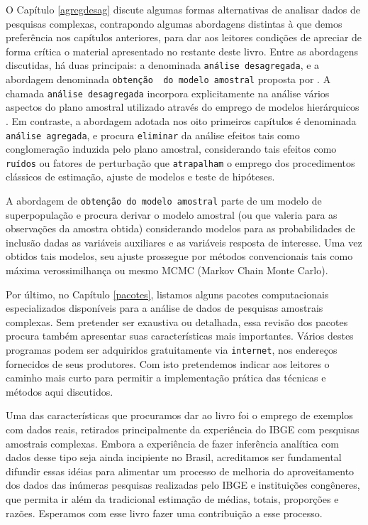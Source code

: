 \documentclass[]{book}
\numberwithin{example}{chapter}
\numberwithin{remark}{chapter}
\numberwithin{definition}{chapter}
\begin{document}
O Capítulo \ref{agregdesag} discute algumas formas alternativas de
analisar dados de pesquisas complexas, contrapondo algumas abordagens
distintas à que demos preferência nos capítulos anteriores, para dar aos
leitores condições de apreciar de forma crítica o material apresentado
no restante deste livro. Entre as abordagens discutidas, há duas
principais: a denominada \texttt{análise\ desagregada}, e a abordagem
denominada \texttt{obtenção\ \ do\ modelo\ amostral} proposta por
\citep{PKR}. A chamada \texttt{análise\ desagregada} incorpora
explicitamente na análise vários aspectos do plano amostral utilizado
através do emprego de modelos hierárquicos \citep{bryk}. Em contraste, a
abordagem adotada nos oito primeiros capítulos é denominada
\texttt{análise\ agregada}, e procura \texttt{eliminar} da análise
efeitos tais como conglomeração induzida pelo plano amostral,
considerando tais efeitos como \texttt{ruídos} ou fatores de perturbação
que \texttt{atrapalham} o emprego dos procedimentos clássicos de
estimação, ajuste de modelos e teste de hipóteses.

A abordagem de \texttt{obtenção\ do\ modelo\ amostral} parte de um
modelo de superpopulação e procura derivar o modelo amostral (ou que
valeria para as observações da amostra obtida) considerando modelos para
as probabilidades de inclusão dadas as variáveis auxiliares e as
variáveis resposta de interesse. Uma vez obtidos tais modelos, seu
ajuste prossegue por métodos convencionais tais como máxima
verossimilhança ou mesmo MCMC (Markov Chain Monte Carlo).

Por último, no Capítulo \ref{pacotes}, listamos alguns pacotes
computacionais especializados disponíveis para a análise de dados de
pesquisas amostrais complexas. Sem pretender ser exaustiva ou detalhada,
essa revisão dos pacotes procura também apresentar suas características
mais importantes. Vários destes programas podem ser adquiridos
gratuitamente via \texttt{internet}, nos endereços fornecidos de seus
produtores. Com isto pretendemos indicar aos leitores o caminho mais
curto para permitir a implementação prática das técnicas e métodos aqui
discutidos.

Uma das características que procuramos dar ao livro foi o emprego de
exemplos com dados reais, retirados principalmente da experiência do
IBGE com pesquisas amostrais complexas. Embora a experiência de fazer
inferência analítica com dados desse tipo seja ainda incipiente no
Brasil, acreditamos ser fundamental difundir essas idéias para alimentar
um processo de melhoria do aproveitamento dos dados das inúmeras
pesquisas realizadas pelo IBGE e instituições congêneres, que permita ir
além da tradicional estimação de médias, totais, proporções e razões.
Esperamos com esse livro fazer uma contribuição a esse processo.
\end{document}
